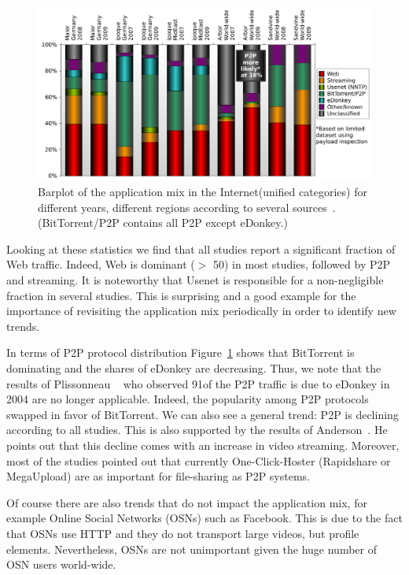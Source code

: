 \begin{figure}[tbp]
\centering
\includegraphics[width=0.95\linewidth]{figures-pdf/appmix}
\renewcommand{\capname}{Barplot of the application mix in the
Internet\xspace}
\caption[\capname]{\capname (unified categories) for different years,
different regions according to several
sources~\cite{OnDominantCharacteristics2009,ipoque09,arbor,sandvine}.
\capcomment (BitTorrent/P2P contains all P2P except eDonkey.)}
\label{fig:related:appmix}
\end{figure}

Looking at these statistics we find that all studies report a significant
fraction of Web traffic. Indeed, Web is dominant ($>$ 50\perc) in most studies,
followed by P2P and streaming. It is noteworthy that Usenet is responsible for
a non-negligible fraction in several studies. This is surprising and a good
example for the importance of revisiting the application mix periodically in
order to identify new trends.

In terms of P2P protocol distribution Figure~\ref{fig:related:appmix} shows
that BitTorrent is dominating and the shares of eDonkey are decreasing.  Thus,
we note that the results of Plissonneau \etal~\cite{plissonneau05} who observed
91\perc of the P2P traffic is due to eDonkey in 2004 are no longer applicable.
Indeed, the popularity among P2P protocols swapped in favor of BitTorrent. We
can also see a general trend: P2P is declining according to all studies. This
is also supported by the results of Anderson~\cite{p2pdrops}. He points out
that this decline comes with an increase in video streaming. Moreover, most of
the studies pointed out that currently One-Click-Hoster (\eg Rapidshare or
MegaUpload) are as important for file-sharing as P2P systems.

Of course there are also trends that do not impact the application mix, for
example Online Social Networks (OSNs) such as Facebook. This is due to the fact
that OSNs use HTTP and they do not transport large videos, but profile
elements. Nevertheless, OSNs are not unimportant given the huge number of OSN
users world-wide.


